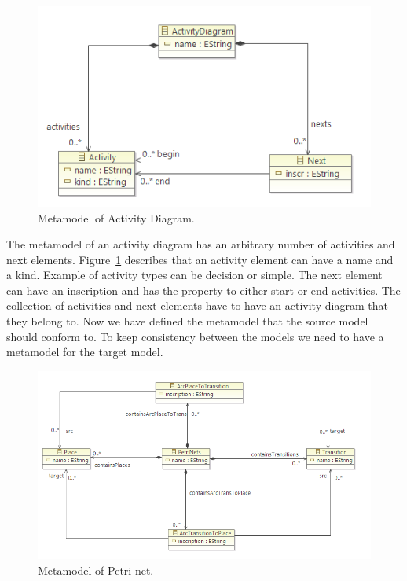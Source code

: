 \documentclass[pdftex,11pt,a4paper]{article}
\begin{document}
\begin{figure}[H]
	\centering
	\includegraphics[scale=0.8]{figures/ActivityMetamodel.png}
	\caption{Metamodel of Activity Diagram.}
	\label{fig:ActivityMetamodel}
\end{figure}

The metamodel of an activity diagram has an arbitrary number of activities and
next elements. Figure~\ref{fig:ActivityMetamodel} describes that an activity
element can have a name and a kind. Example of activity types can be decision or
simple. The next element can have an inscription and has the property to either
start or end activities. The collection of activities and next elements have to
have an activity diagram that they belong to. Now we have defined the metamodel
that the source model should conform to. To keep consistency between the models
we need to have a metamodel for the target model.

\begin{figure}[H]
	\centering
	\includegraphics[scale=0.7]{figures/PetriNetsMetamodel.png}
	\caption{Metamodel of Petri net.}
	\label{fig:PetriNetsMetamodel}
\end{figure}
\end{document}
